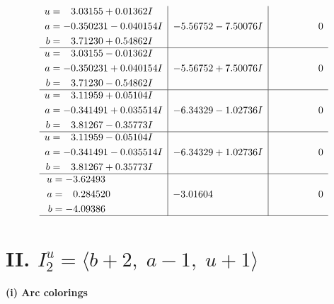 \documentclass[1p]{elsarticle_modified}
\theoremstyle{definition}
\begin{document}
$$\begin{array}{c|c|c}
\begin{aligned}
u &= \phantom{-}3.03155 + 0.01362 I \\
a &= -0.350231 - 0.040154 I \\
b &= \phantom{-}3.71230 + 0.54862 I\end{aligned}
 & -5.56752 - 7.50076 I & \phantom{-0.000000 } 0 \\ \hline\begin{aligned}
u &= \phantom{-}3.03155 - 0.01362 I \\
a &= -0.350231 + 0.040154 I \\
b &= \phantom{-}3.71230 - 0.54862 I\end{aligned}
 & -5.56752 + 7.50076 I & \phantom{-0.000000 } 0 \\ \hline\begin{aligned}
u &= \phantom{-}3.11959 + 0.05104 I \\
a &= -0.341491 + 0.035514 I \\
b &= \phantom{-}3.81267 - 0.35773 I\end{aligned}
 & -6.34329 - 1.02736 I & \phantom{-0.000000 } 0 \\ \hline\begin{aligned}
u &= \phantom{-}3.11959 - 0.05104 I \\
a &= -0.341491 - 0.035514 I \\
b &= \phantom{-}3.81267 + 0.35773 I\end{aligned}
 & -6.34329 + 1.02736 I & \phantom{-0.000000 } 0 \\ \hline\begin{aligned}
u &= -3.62493\phantom{ +0.000000I} \\
a &= \phantom{-}0.284520\phantom{ +0.000000I} \\
b &= -4.09386\phantom{ +0.000000I}\end{aligned}
 & -3.01604\phantom{ +0.000000I} & \phantom{-0.000000 } 0\\
 \hline 
 \end{array}$$\newpage\newpage\renewcommand{\arraystretch}{1}
\centering \section*{II. $I^u_{2}= \langle b+2,\;a-1,\;u+1 \rangle$}
\flushleft \textbf{(i) Arc colorings}\\
\end{document}
